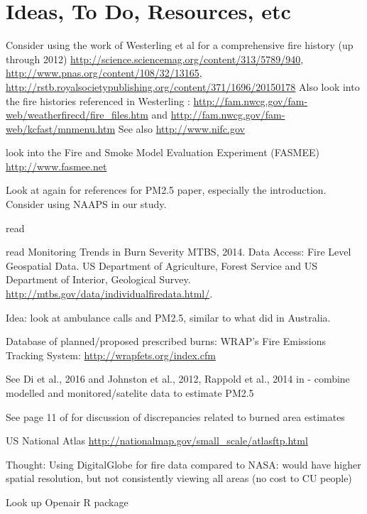 \section{Ideas, To Do, Resources, etc}

Consider using the work of Westerling et al for a comprehensive fire history (up through 2012) \url{http://science.sciencemag.org/content/313/5789/940}, \url{http://www.pnas.org/content/108/32/13165}, \url{http://rstb.royalsocietypublishing.org/content/371/1696/20150178} \cite{westerling_increasing_2016,WesterlingCorrection2016} Also look into the fire histories referenced in Westerling \cite{westerling_increasing_2016,WesterlingCorrection2016}: \url{http://fam.nwcg.gov/fam-web/weatherfirecd/fire_files.htm} and \url{http://fam.nwcg.gov/fam-web/kcfast/mnmenu.htm} See also \url{http://www.nifc.gov}

look into the Fire and Smoke Model Evaluation Experiment (FASMEE) \url{http://www.fasmee.net}

Look at \cite{kollanus_effects_2016} again for references for PM2.5 paper, especially the introduction. Consider using NAAPS in our study. 

read \cite{mcclure_US_2018}

read Monitoring Trends in Burn Severity MTBS, 2014. Data Access: Fire Level Geospatial
Data. US Department of Agriculture, Forest Service and US Department of
Interior, Geological Survey. \url{http://mtbs.gov/data/individualfiredata.html/}.

Idea: look at ambulance calls and PM2.5, similar to what \cite{salimi_ambient_2016} did in Australia.

Database of planned/proposed prescribed burns: WRAP's Fire Emissions Tracking System: \url{http://wrapfets.org/index.cfm}

See Di et al., 2016 and Johnston et al., 2012, Rappold et al., 2014 in \cite{jones_application_2017} - combine modelled and monitored/satelite data to estimate PM2.5

See page 11 of \cite{hyde_air_2017} for discussion of discrepancies related to burned area estimates

US National Atlas \url{http://nationalmap.gov/small_scale/atlasftp.html}

Thought: Using DigitalGlobe for fire data compared to NASA: would have higher spatial resolution, but not consistently viewing all areas (no cost to CU people) 

Look up Openair R package

